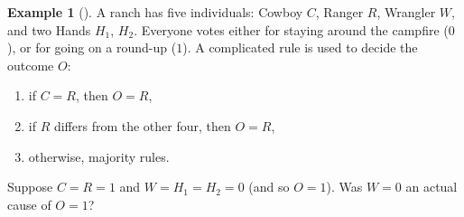 \documentclass[11pt,a4paper]{book}
\theoremstyle{definition}
\theoremstyle{definition}
\newtheorem{example}{Example}[section]
\theoremstyle{definition}
\theoremstyle{remark}
\begin{document}
 \begin{example}[\cite{blanchard2017cause}]
\label{ex:wildwest-1}
A ranch has five individuals: Cowboy $C$, Ranger $R$, Wrangler $W$, and two Hands $H_1$, $H_2$. Everyone votes either for staying around the campfire ($0$), or for going on a round-up ($1$). A complicated rule is used to decide the outcome $O$: 
\begin{enumerate}
\item if $C = R$, then $O = R$,
\item if $R$ differs from the other four, then $O = R$,
\item otherwise, majority rules.
\end{enumerate}
Suppose $C = R = 1$ and $W = H_1 = H_2 = 0$ (and so $O = 1$). Was $W = 0$ an actual cause of $O = 1$?
 \end{example}




%
%
%
%



%
%
% 
\end{document}
